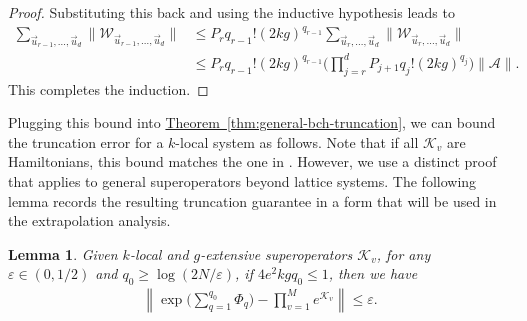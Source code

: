\documentclass[11pt]{article}
\newtheorem{lemma}{Lemma}
\newcommand{\thm}[1]{\hyperref[thm:#1]{Theorem~\ref*{thm:#1}}}
\newcommand{\eps}{\varepsilon}
\newcommand{\mc}{\mathcal}
\begin{document}
\begin{proof}
    Substituting this back and using the inductive hypothesis leads to
    \begin{align*}
        \sum_{\vec{u}_{r-1}, \ldots, \vec{u}_d} \Big\|\mathcal{W}_{\vec{u}_{r-1}, \ldots, \vec{u}_d}\Big\| 
        &\le P_r q_{r-1}! (2kg)^{q_{r-1}} \sum_{\vec{u}_{r}, \ldots, \vec{u}_d} \Big\|\mathcal{W}_{\vec{u}_{r}, \ldots, \vec{u}_d}\Big\| \\
        &\le P_r q_{r-1}! (2kg)^{q_{r-1}}  \bigg(\prod_{j=r}^{d}P_{j+1} q_j!(2kg)^{q_j}\bigg)\|\mc A\|.
    \end{align*}
    This completes the induction.
\end{proof}

Plugging this bound into \thm{general-bch-truncation}, we can bound the truncation error for a $k$-local system as follows. Note that if all $\mathcal{K}_v$ are Hamiltonians, this bound matches the one in \citet[Theorem 3]{mizuta2025commutator}. However, we use a distinct proof that applies to general superoperators beyond lattice systems. The following lemma records the resulting truncation guarantee in a form that will be used in the extrapolation analysis.
\begin{lemma}
\label{lem:bch-approx}
    Given $k$-local and $g$-extensive superoperators $\mc K_v$, for any $\eps\in (0,1/2)$ and  $q_0 \ge \log(2N/\eps)$, if $4e^2kgq_0\le 1$, then we have \begin{align*}
        \left\|\exp\Big(\sum_{q=1}^{q_0} \Phi_q\Big) - \prod_{v = 1}^Me^{\mc K_v} \right\|\le \eps.
    \end{align*}
\end{lemma}
\end{document}

